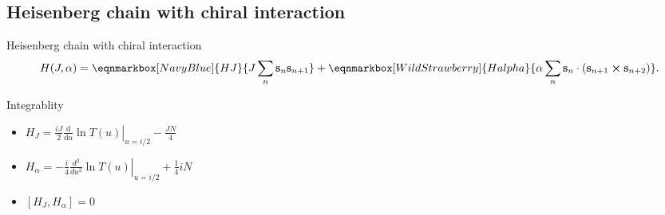 \subsection{Heisenberg chain with chiral interaction}
\begin{frame}{Heisenberg chain with chiral interaction}
\begin{equation*}
    H(J, \alpha) =
    \eqnmarkbox[NavyBlue]{HJ}{J \sum_{n} \mathbf{s}_n \mathbf{s}_{n+1}}
    + \eqnmarkbox[WildStrawberry]{Halpha}{\alpha \sum_{n} \mathbf{s}_n \cdot (\mathbf{s}_{n+1} \cross \mathbf{s}_{n+2})}.
\end{equation*}

\vspace{0.5cm}

\begin{block}{Integrablity}
\begin{itemize}
    \item $H_J = \frac{iJ}{2}\left.\frac{\mathrm{d}}{\mathrm{d}u}\ln T(u)\right|_{u=i/2}-\frac{JN}{4}$
    \item $H_{\alpha} = \left. -\frac{i}{4} \frac{d^2}{du^2} \ln T(u) \right|_{u=i/2}
     +\frac{1}{4} iN$
    \item $[H_J , H_{\alpha}] = 0$
\end{itemize}
\end{block}

\end{frame}
